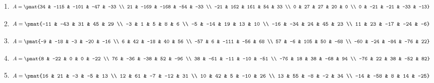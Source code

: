\begin{enumerate}
\item

\begin{align*}
A = \pmat{34 & -115 & -101 & -47 & -33 \\ 21 & -169 & -168 & -54 & -33 \\ -21 & 162 & 161 & 54 & 33 \\ 0 & 27 & 27 & 20 & 0 \\ 0 & -21 & -21 & -33 & -13}
\end{align*}

\item

\begin{align*}
A = \pmat{-11 & -43 & 31 & 45 & 29 \\ -3 & 1 & 5 & 8 & 6 \\ -5 & -14 & 19 & 13 & 10 \\ -16 & -34 & 24 & 45 & 23 \\ 11 & 23 & -17 & -24 & -6}
\end{align*}

\item

\begin{align*}
A = \pmat{-9 & -18 & -3 & -20 & -16 \\ 6 & 42 & -18 & 40 & 56 \\ -57 & 6 & -111 & -56 & 68 \\ 57 & -6 & 105 & 50 & -68 \\ -60 & -24 & -84 & -76 & 22}
\end{align*}

\item

\begin{align*}
A = \pmat{8 & -22 & 0 & 0 & -22 \\ 76 & -36 & -38 & 52 & -96 \\ 38 & -61 & -11 & -10 & -51 \\ -76 & 18 & 38 & -68 & 94 \\ -76 & 22 & 38 & -52 & 82}
\end{align*}

\item

\begin{align*}
A = \pmat{16 & 21 & -3 & -5 & 13 \\ 12 & 61 & -7 & -12 & 31 \\ 10 & 42 & 5 & -10 & 26 \\ 13 & 55 & -8 & -2 & 34 \\ -14 & -58 & 8 & 14 & -25}
\end{align*}


\end{enumerate}
